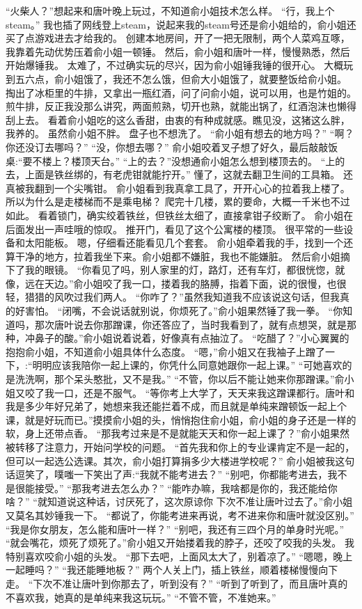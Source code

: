 “火柴人？”想起来和唐叶晚上玩过，不知道俞小姐技术怎么样。
“行，我上个steam。”
我也插了网线登上steam，说起来我的steam号还是俞小姐给的，俞小姐还买了点游戏进去才给我的。
创建本地房间，开了一把无限制，两个人菜鸡互啄，我靠着先动优势压着俞小姐一顿锤。
然后，俞小姐和唐叶一样，慢慢熟悉，然后开始爆锤我。
太难了，不过确实玩的尽兴，因为俞小姐锤我锤的很开心。
大概玩到五六点，俞小姐饿了，我还不怎么饿，但俞大小姐饿了，就要整饭给俞小姐。
掏出了冰柜里的牛排，又拿出一瓶红酒，问了问俞小姐，说可以用，也是竹姐的。
煎牛排，反正我没那么讲究，两面煎熟，切开也熟，就能出锅了，红酒泡沫也懒得刮上去。
看着俞小姐吃的这么香甜，由衷的有种成就感。瞧见没，这猪这么胖，我养的。
虽然俞小姐不胖。
盘子也不想洗了。
“俞小姐有想去的地方吗？”
“啊？你还没订去哪吗？”
“没，你想去哪？”
俞小姐咬着叉子想了好久，最后敲敲饭桌:“要不楼上？楼顶天台。”
“上的去？”没想通俞小姐怎么想到楼顶去的。
“上的去，上面是铁丝绑的，有老虎钳就能拧开。”
懂了，这就去翻卫生间的工具箱。
还真被我翻到一个尖嘴钳。
俞小姐看到我真拿工具了，开开心心的拉着我上楼了。
所以为什么是走楼梯而不是乘电梯？
爬完十几楼，累的要命，大概一千米也不过如此。
看着锁门，确实绞着铁丝，但铁丝太细了，直接拿钳子绞断了。
俞小姐在后面发出一声哇哦的惊叹。
推开门，看见了这个公寓楼的楼顶。
很平常的一些设备和太阳能板。
嗯，仔细看还能看见几个套套。
俞小姐牵着我的手，找到一个还算干净的地方，拉着我坐下来。俞小姐都不嫌脏，我也不能嫌脏。
然后俞小姐摘下了我的眼镜。
“你看见了吗，别人家里的灯，路灯，还有车灯，都很恍惚，就像，远在天边。”俞小姐咬了我一口，搂着我的胳膊，指着下面，说的很慢，也很轻，猎猎的风吹过我们两人。
“你咋了？”虽然我知道我不应该说这句话，但我真的好害怕。
“闭嘴，不会说话就别说，你烦死了。”俞小姐果然锤了我一拳。
“你知道吗，那次唐叶说去你那蹭课，你还答应了，当时我看到了，就有点想哭，就是那种，冲鼻子的酸。”俞小姐说着说着，好像真有点抽泣了。
“吃醋了？”小心翼翼的抱抱俞小姐，不知道俞小姐具体什么态度。
“嗯，”俞小姐又在我袖子上蹭了一下，:“明明应该我陪你一起上课的，你凭什么同意她跟你一起上课。”
“可她喜欢的是洗洗啊，那个呆头憨批，又不是我。”
“不管，你以后不能让她来你那蹭课。”俞小姐又咬了我一口，还是不服气。
“等你考上大学了，天天来我这蹭课都行。唐叶和我是多少年好兄弟了，她想来我还能拦着不成，而且就是单纯来蹭顿饭一起上个课，就是好玩而已。”摸摸俞小姐的头，悄悄抱住俞小姐，俞小姐的身子还是一样的软，身上还带点香。
“那我考过来是不是就能天天和你一起上课了？”俞小姐果然被转移了注意力，开始问学校的问题。
“首先我和你上的专业课肯定不是一起的，但可以一起选公选课。其次，俞小姐打算捐多少大楼进学校呢？”
俞小姐被我这句话逗笑了，噗嗤一下笑出了声:“我就不能考进去？”
“别吧，你都能考进去，我不是很能接受。”
“那我考进去怎么办？”
“能咋办嘛，我啥都是你的，我还能给你啥？”
“就知道说这种话，讨厌死了，这次原谅你 下次不准让唐叶过去了。”俞小姐又莫名其妙锤我一下。
“都说了，你能考进来再说，考不进来你和唐叶就没区别。”
“我是你女朋友，怎么能和唐叶一样？”
“别吧，我还有三四个月的单身时光呢。”
“就会嘴花，烦死了烦死了。”俞小姐又开始搂着我的脖子，还咬了咬我的头发。
我特别喜欢咬俞小姐的头发。
“那下去吧，上面风太大了，别着凉了。”
“嗯嗯，晚上一起睡吗？”
“我还能睡地板？”
两个人关上门，插上铁丝，顺着楼梯慢慢向下走。
“下次不准让唐叶到你那去了，听到没有？”
“听到了听到了，而且唐叶真的不喜欢我，她真的是单纯来我这玩玩。”
“不管不管，不准她来。”

